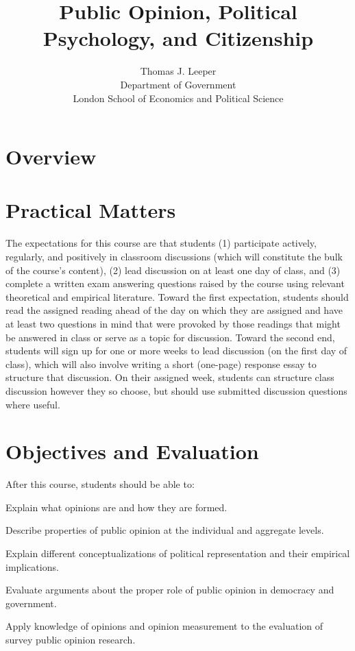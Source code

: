 \documentclass[12pt,a4paper]{article}
\title{Public Opinion, Political Psychology, and Citizenship}
\author{Thomas J. Leeper\\
Department of Government\\
London School of Economics and Political Science}
\begin{document}
\nobibliography*

\maketitle

\faketableofcontents

\section{Overview}


\section{Practical Matters}

The expectations for this course are that students (1) participate actively, regularly, and positively in classroom discussions (which will constitute the bulk of the course's content), (2) lead discussion on at least one day of class, and (3) complete a written exam answering questions raised by the course using relevant theoretical and empirical literature. Toward the first expectation, students should read the assigned reading ahead of the day on which they are assigned and have at least two questions in mind that were provoked by those readings that might be answered in class or serve as a topic for discussion. Toward the second end, students will sign up for one or more weeks to lead discussion (on the first day of class), which will also involve writing a short (one-page) response essay to structure that discussion. On their assigned week, students can structure class discussion however they so choose, but should use submitted discussion questions where useful.

\section{Objectives and Evaluation}
After this course, students should be able to:
\begin{enumerate*}
\item Explain what opinions are and how they are formed.
\item Describe properties of public opinion at the individual and aggregate levels.
\item Explain different conceptualizations of political representation and their empirical implications.
\item Evaluate arguments about the proper role of public opinion in democracy and government.
\item Apply knowledge of opinions and opinion measurement to the evaluation of survey public opinion research.
\end{enumerate*}
\end{document}
